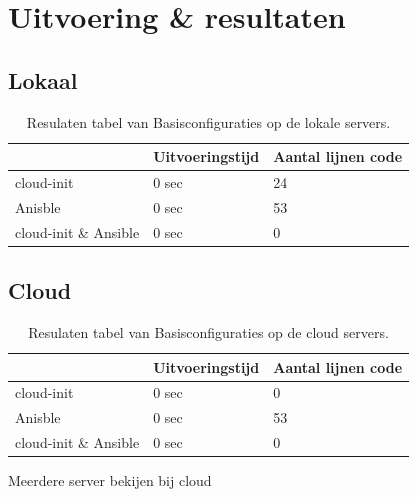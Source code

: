 \section{Uitvoering \& resultaten}

\subsection{Lokaal}

\begin{table}[!htb]
    \centering
    \begin{tabular}{| l | l | l |}
        \hline
         & \textbf{Uitvoeringstijd} & \textbf{Aantal lijnen code}  \\ \hline
        cloud-init & 0 sec & 24 \\ \hline
        Anisble & 0 sec & 53 \\ \hline
        cloud-init \& Ansible & 0 sec & 0 \\
        \hline
    \end{tabular}
	\caption{Resulaten tabel van Basisconfiguraties op de lokale servers.}
    \label{tab:tabel lokale resultaten basis}
\end{table}



\subsection{Cloud}

\begin{table}[!htb]
    \centering
    \begin{tabular}{| l | l | l |}
        \hline
        & \textbf{Uitvoeringstijd} & \textbf{Aantal lijnen code}  \\ \hline
        cloud-init & 0 sec & 0 \\ \hline
        Anisble & 0 sec & 53 \\ \hline
        cloud-init \& Ansible & 0 sec & 0 \\
        \hline
    \end{tabular}
    \caption{Resulaten tabel van Basisconfiguraties op de cloud servers.}
    \label{tab:tabel cloud resultaten basis}
\end{table}

Meerdere server bekijen bij cloud